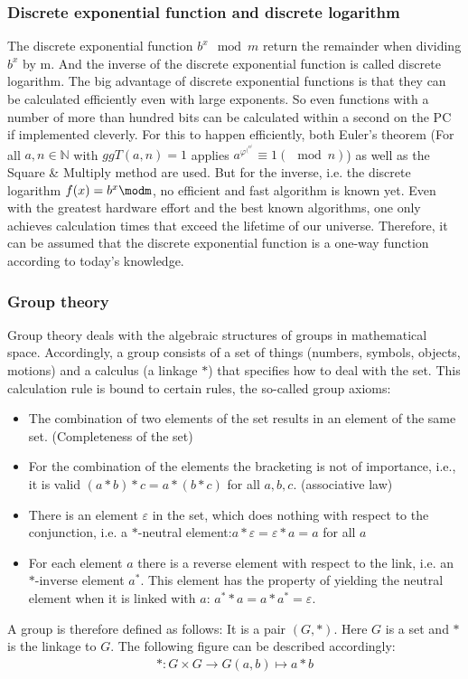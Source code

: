 \subsubsection{Discrete exponential function and discrete logarithm}
The discrete exponential function \(b^x\mod m\) return the remainder when dividing \(b^x\) by m. 
And the inverse of the discrete exponential function is called discrete logarithm.
\newline
The big advantage of discrete exponential functions is that they can be calculated efficiently even with large exponents. So even functions with a number of more than hundred bits can be calculated within a second on the PC if implemented cleverly. For this to happen efficiently, both Euler's theorem
\newline 
(For all \(a, n \in \mathbb{N}\) with \(ggT(a,n) = 1\)
applies \(a^\varphi^(^n^) \equiv 1 (\mod n)\))
\newline 
as well as the Square & Multiply method are used.
\newline
But for the inverse, i.e. the discrete logarithm \(f(x) = b^x\modm\), no efficient and fast algorithm is known yet. Even with the greatest hardware effort and the best known algorithms, one only achieves calculation times that exceed the lifetime of our universe. Therefore, it can be assumed that the discrete exponential function is a one-way function according to today's knowledge. \cite{Diffie-Hellman_key_exchange}
\newpage
\subsubsection{Group theory}
Group theory deals with the algebraic structures of groups in mathematical space. 
Accordingly, a group consists of a set of things (numbers, symbols, objects, motions) and a calculus (a linkage \(*\)) that specifies how to deal with the set. This calculation rule is bound to certain rules, the so-called group axioms:
\begin{itemize}
    \item The combination of two elements of the set results in an element of the same set. (Completeness of the set)
    \item For the combination of the elements the bracketing is not of importance, i.e., it is valid \((a * b) * c = a * (b * c)\) for all \(a,b,c\). (associative law)
    \item There is an element \(\varepsilon\) in the set, which does nothing with respect to the conjunction, i.e. a \(*\)-neutral element:\(a * \varepsilon = \varepsilon * a = a\) for all \(a\)
    \item For each element \(a\) there is a reverse element with respect to the link, i.e. an \(*\text{-inverse}\) element \(a^*\). This element has the property of yielding the neutral element when it is linked with \(a\): \(a^* * a = a * a^* = \varepsilon\).
\end{itemize}
A group is therefore defined as follows: It is a pair \((G, *)\). Here \(G\) is a set and \(*\) is the linkage to \(G\). 
The following figure can be described accordingly:  \cite{Diffie-Hellman_key_exchange}
\begin{eqnarray*}
*: G \times G \to G (a, b) \mapsto a * b
\end{eqnarray*}
